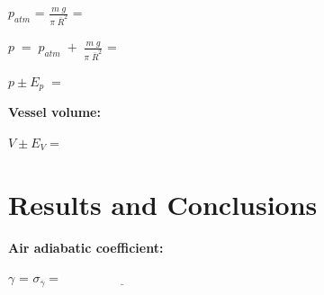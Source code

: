 \documentclass{article}
\begin{document}
\vspace{5mm}

$p_{atm}$ = \underline{\hspace{4cm}} \hspace{1cm} $\frac{m
\; g}{\pi \; \overline{R}^2}$ = \underline{\hspace{4cm}}

\vspace{5mm}

$p \; = \; p_{atm} \; + \; \frac{m \; g}{\pi \;
\overline{R}^2}$ = \underline{\hspace{4cm}}

\vspace{5mm}

$p\pm E_p \; = $ \underline{\hspace{4cm}}

\vspace{5mm}


\textbf{Vessel volume:}

\vspace{5mm}

$V \pm E_V = $ \underline{\hspace{3cm}}
%


\section{Results and Conclusions}

\vspace{10mm}

\textbf{Air adiabatic coefficient:}

\vspace{5mm}
{\LARGE
$\gamma$ = \underline{\hspace{4cm}}
\hspace{1cm}
$\sigma_{\overline{\gamma}}=\underline{\hspace{4cm}}$
}

\nocite{Smith:2012qr}






\end{document}
